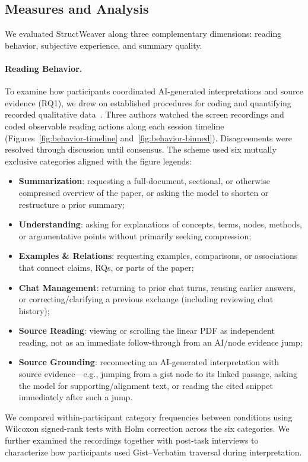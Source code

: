 \documentclass[manuscript,review,anonymous]{acmart}
\begin{document}
\subsection{Measures and Analysis}

We evaluated StructWeaver along three complementary dimensions: reading behavior, subjective experience, and summary quality.

\paragraph{Reading Behavior.}
To examine how participants coordinated AI-generated interpretations and source evidence (RQ1), we drew on established procedures for coding and quantifying recorded qualitative data~\cite{chi1997quantifying}. Three authors watched the screen recordings and coded observable reading actions along each session timeline (Figures~\ref{fig:behavior-timeline} and~\ref{fig:behavior-binned}). Disagreements were resolved through discussion until consensus. The scheme used six mutually exclusive categories aligned with the figure legends:
\begin{itemize}[leftmargin=*, noitemsep]
    \item \textbf{Summarization}: requesting a full-document, sectional, or otherwise compressed overview of the paper, or asking the model to shorten or restructure a prior summary;
    \item \textbf{Understanding}: asking for explanations of concepts, terms, nodes, methods, or argumentative points without primarily seeking compression;
    \item \textbf{Examples \& Relations}: requesting examples, comparisons, or associations that connect claims, RQs, or parts of the paper;
    \item \textbf{Chat Management}: returning to prior chat turns, reusing earlier answers, or correcting/clarifying a previous exchange (including reviewing chat history);
    \item \textbf{Source Reading}: viewing or scrolling the linear PDF as independent reading, not as an immediate follow-through from an AI/node evidence jump;
    \item \textbf{Source Grounding}: reconnecting an AI-generated interpretation with source evidence---e.g., jumping from a gist node to its linked passage, asking the model for supporting/alignment text, or reading the cited snippet immediately after such a jump.
\end{itemize}
We compared within-participant category frequencies between conditions using Wilcoxon signed-rank tests with Holm correction across the six categories. We further examined the recordings together with post-task interviews to characterize how participants used Gist--Verbatim traversal during interpretation.
\end{document}
